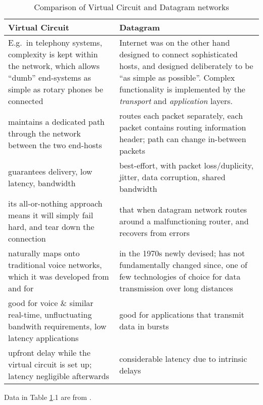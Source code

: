 \documentclass[10pt]{report}
\begin{document}
\begin{table}[h]
  \label{vc_dg_comparison}
  \begin{tabular}{ | p{6cm} | p{6cm} | }
  \hline

  Virtual Circuit
  	& Datagram \\ \hline

E.g.\ in telephony systems, complexity is kept within the network, which allows ``dumb'' end-systems as simple as rotary phones be connected \cite[p349]{kurose}
	& Internet was on the other hand designed to connect sophisticated
	hosts, and designed deliberately to be ``as simple as possible''.  Complex functionality is implemented by the {\em transport} and {\em application} layers. \cite[pp349--351]{kurose}
	\\ \hline

maintains a dedicated path through the network between the two end-hosts 
	& routes each packet separately, each packet contains routing
	information header; path can change in-between packets \\ \hline

guarantees delivery, low latency, bandwidth
	& best-effort, with packet loss/duplicity, jitter, data corruption,
	shared bandwidth \\ \hline

its all-or-nothing approach means it will simply fail hard, and tear down the
connection
	&  that when datagram network routes around a malfunctioning router,
	and recovers from errors \\ \hline

naturally maps onto traditional voice networks, which it was developed from and
for
	& in the 1970s newly devised; has not fundamentally changed since, one
	of few technologies of choice for data transmission over long distances
	\cite[p298--299]{stallings} \\ \hline

good for voice \& similar real-time, unfluctuating bandwith requirements, low
latency applications
	& good for applications that transmit data in bursts \\ \hline

upfront delay while the virtual circuit is set up; latency negligible afterwards
	& considerable latency due to intrinsic delays \\ \hline

  \end{tabular} \caption{Comparison of Virtual Circuit and Datagram networks} \end{table} 
Data in Table
\ref{vc_dg_comparison}.1
are from \cite{kurose} \cite[p298--299]{stallings} \cite{russell}.
\end{document}
